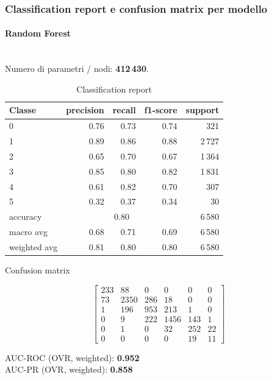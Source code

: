 \documentclass[a4paper,12pt]{report}
\begin{document}
	\subsubsection{Classification report e confusion matrix per modello}
	
	\paragraph{Random Forest} \mbox{}\\
	Numero di parametri / nodi: \textbf{412\,430}.
	
	\begin{table}[H]
		\centering
		\caption{Classification report}
		\label{tab:cr_rf}
		\begin{tabular}{lrrrr}
			\toprule
			Classe & precision & recall & f1-score & support \\
			\midrule
			0 & 0.76 & 0.73 & 0.74 & 321 \\
			1 & 0.89 & 0.86 & 0.88 & 2\,727 \\
			2 & 0.65 & 0.70 & 0.67 & 1\,364 \\
			3 & 0.85 & 0.80 & 0.82 & 1\,831 \\
			4 & 0.61 & 0.82 & 0.70 & 307 \\
			5 & 0.32 & 0.37 & 0.34 & 30 \\
			\midrule
			accuracy & \multicolumn{3}{c}{0.80} & 6\,580 \\
			macro avg & 0.68 & 0.71 & 0.69 & 6\,580 \\
			weighted avg & 0.81 & 0.80 & 0.80 & 6\,580 \\
			\bottomrule
		\end{tabular}
	\end{table}
	
	\begin{table}[H]
		\centering
		\caption{Confusion matrix}
		\label{tab:cm_rf}
		\[
		\begin{bmatrix}
			233 & 88  & 0   & 0   & 0   & 0   \\
			73  & 2350& 286 & 18  & 0   & 0   \\
			1   & 196 & 953 & 213 & 1   & 0   \\
			0   & 9   & 222 & 1456& 143 & 1   \\
			0   & 1   & 0   & 32  & 252 & 22  \\
			0   & 0   & 0   & 0   & 19  & 11
		\end{bmatrix}
		\]
		\vspace{1mm}
		
		AUC-ROC (OVR, weighted): \textbf{0.952} \\
		AUC-PR  (OVR, weighted): \textbf{0.858}
	\end{table}
	
\end{document}
